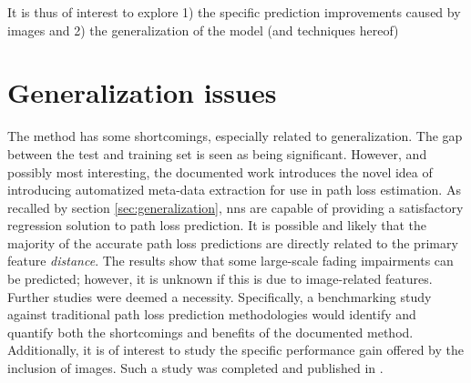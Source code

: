 It is thus of interest to explore 1) the specific prediction improvements caused by images and 2) the generalization of the model (and techniques hereof)

\section{Generalization issues}\label{sec:summary_version1}
The method has some shortcomings, especially related to generalization. The gap between the test and training set is seen as being significant. However, and possibly most interesting, the documented work introduces the novel idea of introducing automatized meta-data extraction for use in path loss estimation.
As recalled by section \ref{sec:generalization}, \glspl{nn} are capable of providing a satisfactory regression solution to path loss prediction. It is possible and likely that the majority of the accurate path loss predictions are directly related to the primary feature \emph{distance}. The results show that some large-scale fading impairments can be predicted; however, it is unknown if this is due to image-related features. Further studies were deemed a necessity. Specifically, a benchmarking study against traditional path loss prediction methodologies would identify and quantify both the shortcomings and benefits of the documented method. Additionally, it is of interest to study the specific performance gain offered by the inclusion of images. Such a study was completed and published in \cite{Thrane020ModelAidedDeepLearning}.  